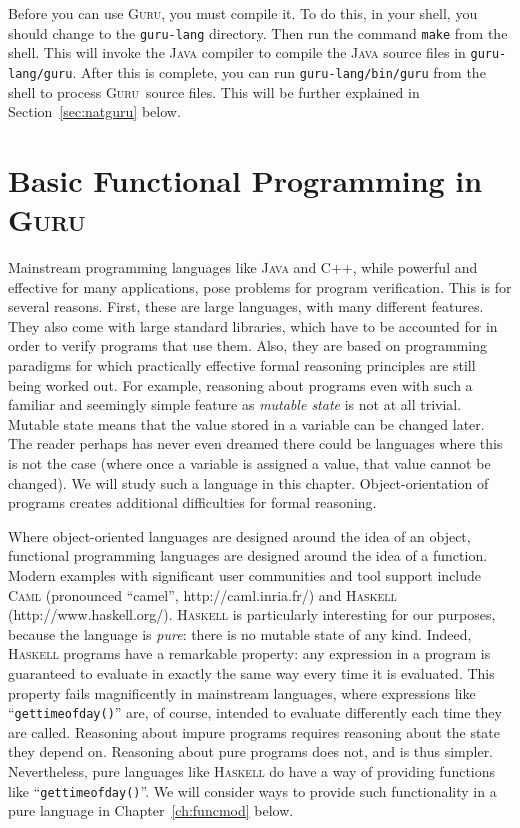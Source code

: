 \documentclass{book}[12pt]
\newcommand{\guru}[0]{\textsc{Guru}}
\begin{document}
Before you can use \guru, you must compile it.  To do this, in your
shell, you should change to the \texttt{guru-lang} directory.  Then
run the command \texttt{make} from the shell.  This will invoke the
\textsc{Java} compiler to compile the \textsc{Java} source files in
\texttt{guru-lang/guru}.  After this is complete, you can run
\texttt{guru-lang/bin/guru} from the shell to process \guru\ source
files.  This will be further explained in Section~\ref{sec:natguru}
below.

\chapter{Basic Functional Programming in \guru}
\label{ch:prog}

Mainstream programming languages like \textsc{Java} and \textsc{C++},
while powerful and effective for many applications, pose problems for
program verification.  This is for several reasons.  First, these are
large languages, with many different features.  They also come with
large standard libraries, which have to be accounted for in order to
verify programs that use them.  Also, they are based on programming
paradigms for which practically effective formal reasoning principles
are still being worked out.  For example, reasoning about programs
even with such a familiar and seemingly simple feature as
\emph{mutable state} is not at all trivial.  Mutable state means that
the value stored in a variable can be changed later.  The reader
perhaps has never even dreamed there could be languages where this is
not the case (where once a variable is assigned a value, that value
cannot be changed).  We will study such a language in this chapter.
Object-orientation of programs creates additional difficulties for
formal reasoning.

Where object-oriented languages are designed around the idea of an
object, functional programming languages are designed around the idea
of a function.  Modern examples with significant user communities and
tool support include \textsc{Caml} (pronounced ``camel'',
http://caml.inria.fr/) and \textsc{Haskell} (http://www.haskell.org/).
\textsc{Haskell} is particularly interesting for our purposes, because
the language is \emph{pure}: there is no mutable state of any kind.
Indeed, \textsc{Haskell} programs have a remarkable property: any
expression in a program is guaranteed to evaluate in exactly the same
way every time it is evaluated.  This property fails magnificently in
mainstream languages, where expressions like
``\texttt{gettimeofday()}'' are, of course, intended to evaluate
differently each time they are called.  Reasoning about impure
programs requires reasoning about the state they depend on.  Reasoning
about pure programs does not, and is thus simpler.  Nevertheless, pure
languages like \textsc{Haskell} do have a way of providing functions
like ``\texttt{gettimeofday()}''.  We will consider ways to provide
such functionality in a pure language in Chapter~\ref{ch:funcmod}
below.
\end{document}
